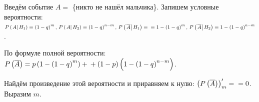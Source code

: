 Введём событие $A =$ \{никто не нашёл мальчика\}.
Запишем условные вероятности:
$P \left( \left. A \right| H_1 \right) =
\left( 1-q \right)^m, \,
P \left( \left. A \right| H_2 \right) =
\left( 1-q \right)^{n-m}, \,
P \left( \left. \overline{A} \right| H_1 \right) = \\
= 1 - \left( 1-q \right)^m, \,
P \left( \left. \overline{A} \right| H_2 \right) =
1 - \left( 1-q \right)^{n-m}$.

По формуле полной вероятности:
$P \left( \overline{A} \right) =
p \left( 1 - \left( 1-q \right)^m \right) +  \\
+ \left( 1-p \right) \left( 1 - \left(1-q \right)^{n-m} \right) $.

Найдём произведение этой вероятности и приравняем к нулю: $ \left( P \left( \overline{A} \right) \right)_m' = \\ = 0$.
Выразим $m$.

